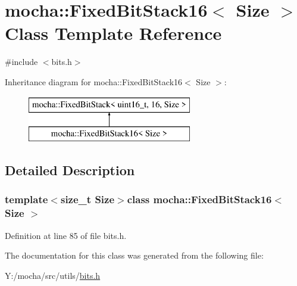 \hypertarget{classmocha_1_1_fixed_bit_stack16}{
\section{mocha::FixedBitStack16$<$ Size $>$ Class Template Reference}
\label{classmocha_1_1_fixed_bit_stack16}
}


{\ttfamily \#include $<$bits.h$>$}

Inheritance diagram for mocha::FixedBitStack16$<$ Size $>$:\begin{figure}[H]
\begin{center}
\leavevmode
\includegraphics[height=2.000000cm]{classmocha_1_1_fixed_bit_stack16}
\end{center}
\end{figure}


\subsection{Detailed Description}
\subsubsection*{template$<$size\_\-t Size$>$class mocha::FixedBitStack16$<$ Size $>$}



Definition at line 85 of file bits.h.



The documentation for this class was generated from the following file:\begin{DoxyCompactItemize}
\item 
Y:/mocha/src/utils/\hyperlink{bits_8h}{bits.h}\end{DoxyCompactItemize}
